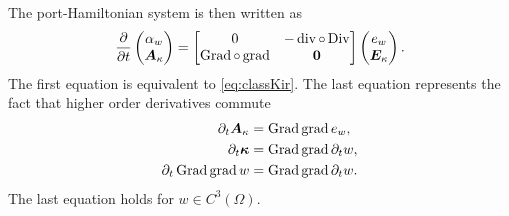 The port-Hamiltonian system is then written as
\begin{equation}\label{eq:pHdyn_Kir}
\diffp{}{t}
\begin{pmatrix}
\alpha_w \\
\bm{A}_{\kappa} \\
\end{pmatrix} = 
\begin{bmatrix}
	0  &  - \div \circ \Div \\
	\Grad \circ \grad & \bm{0} \\
	\end{bmatrix}
\begin{pmatrix}
e_w \\
\bm{E}_{\kappa} \\
\end{pmatrix}.
\end{equation}
The first equation is equivalent to \eqref{eq:classKir}. The last equation represents the fact that higher order derivatives commute
\begin{align*}
\partial_t \bm{A}_{\kappa} &= \operatorname*{Grad}\operatorname*{grad} e_w, \\
\partial_t \bm{\kappa} &= \operatorname*{Grad}\operatorname*{grad} \partial_t w, \\
\partial_t \operatorname*{Grad}\operatorname*{grad} w  &= \operatorname*{Grad}\operatorname*{grad} \partial_t w. \\
\end{align*}
The last equation holds for $w \in C^3(\Omega)$.
